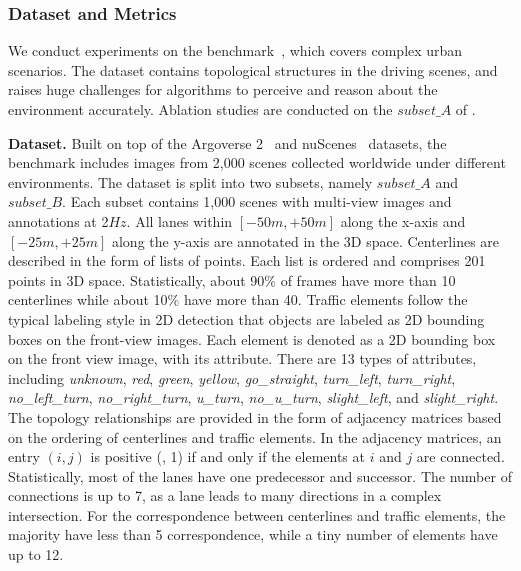 \subsubsection{Dataset and Metrics}

We conduct experiments on the \datasetname benchmark~\cite{openlanev2}, which covers complex urban scenarios. 
The dataset contains topological structures in the driving scenes, and raises huge challenges for algorithms to perceive and reason about the environment accurately.
Ablation studies are conducted on the $subset\_A$ of \datasetname.

\smallskip
\noindent
\textbf{Dataset.}
Built on top of the Argoverse 2~\citep{wilson2av2} and nuScenes~\citep{caesar2020nuscenes} datasets, the \datasetname benchmark includes images from 2,000 scenes collected worldwide under different environments.
The dataset is split into two subsets, namely $subset\_A$ and $subset\_B$.
Each subset contains 1,000 scenes with multi-view images and annotations at 2$Hz$.
All lanes within $[-50m, +50m]$ along the x-axis and $[-25m, +25m]$ along the y-axis are annotated in the 3D space.
Centerlines are described in the form of lists of points.
Each list is ordered and comprises 201 points in 3D space.
Statistically, about 90\% of frames have more than 10 centerlines while about 10\% have more than 40.
Traffic elements follow the typical labeling style in 2D detection that objects are labeled as 2D bounding boxes on the front-view images.
Each element is denoted as a 2D bounding box on the front view image, with its attribute.
There are 13 types of attributes, including \textit{unknown}, \textit{red}, \textit{green}, \textit{yellow}, \textit{go\_straight}, \textit{turn\_left}, \textit{turn\_right}, \textit{no\_left\_turn}, \textit{no\_right\_turn}, \textit{u\_turn}, \textit{no\_u\_turn}, \textit{slight\_left}, and \textit{slight\_right}.
The topology relationships are provided in the form of adjacency matrices based on the ordering of centerlines and traffic elements.
In the adjacency matrices, an entry $(i, j)$ is positive (\ie, 1) if and only if the elements at $i$ and $j$ are connected.
Statistically, most of the lanes have one predecessor and successor. 
The number of connections is up to 7, as a lane leads to many directions in a complex intersection.
For the correspondence between centerlines and traffic elements, the majority have less than 5 correspondence, while a tiny number of elements have up to 12.

